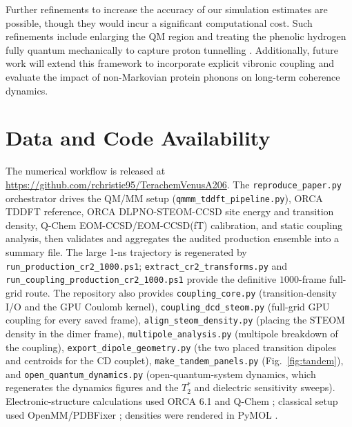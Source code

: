 \documentclass[journal=jpcbfk, manuscript=article, layout=twocolumn, doi=true]{achemso}
\begin{document}
Further refinements to increase the accuracy of our simulation estimates are possible, though they would incur a significant computational cost. Such refinements include enlarging the QM region and treating the phenolic hydrogen fully quantum mechanically to capture proton tunnelling \cite{chakraborty2008development,bourne2024quantum}. Additionally, future work will extend this framework to incorporate explicit vibronic coupling and evaluate the impact of non-Markovian protein phonons on long-term coherence dynamics.

\section{Data and Code Availability}

{\sloppy
The numerical workflow is released at \url{https://github.com/rchristie95/TerachemVenusA206}. The \texttt{reproduce\_paper.py} orchestrator drives the QM/MM setup (\texttt{qmmm\_\allowbreak tddft\_\allowbreak pipeline.py}), ORCA TDDFT reference, ORCA DLPNO-STEOM-CCSD site energy and transition density, Q-Chem EOM-CCSD/EOM-CCSD(fT) calibration, and static coupling analysis, then validates and aggregates the audited production ensemble into a summary file. The large 1-ns trajectory is regenerated by \texttt{run\_\allowbreak production\_\allowbreak cr2\_\allowbreak 1000.ps1}; \texttt{extract\_\allowbreak cr2\_\allowbreak transforms.py} and \texttt{run\_\allowbreak coupling\_\allowbreak production\_\allowbreak cr2\_\allowbreak 1000.ps1} provide the definitive $1000$-frame full-grid route. The repository also provides \texttt{coupling\_core.py} (transition-density I/O and the GPU Coulomb kernel), \texttt{coupling\_\allowbreak dcd\_\allowbreak steom.py} (full-grid GPU coupling for every saved frame), \texttt{align\_\allowbreak steom\_\allowbreak density.py} (placing the STEOM density in the dimer frame), \texttt{multipole\_analysis.py} (multipole breakdown of the coupling), \texttt{export\_\allowbreak dipole\_\allowbreak geometry.py} (the two placed transition dipoles and centroids for the CD couplet), \texttt{make\_tandem\_panels.py} (Fig.~\ref{fig:tandem}), and \texttt{open\_\allowbreak quantum\_\allowbreak dynamics.py} (open-quantum-system dynamics, which regenerates the dynamics figures and the $T_2^*$ and dielectric sensitivity sweeps). Electronic-structure calculations used ORCA 6.1 \cite{neese2020orca,neese2022orca} and Q-Chem \cite{epifanovsky2021qchem}; classical setup used OpenMM/PDBFixer \cite{openmm2017,pdbfixer}; densities were rendered in PyMOL \cite{delano2002pymol}.
\par}
\end{document}
